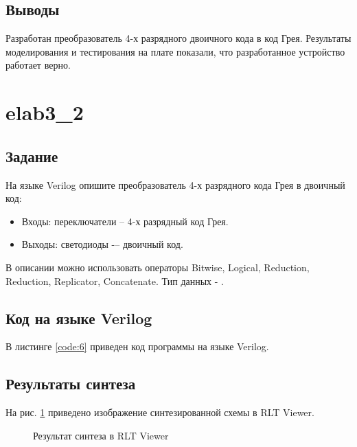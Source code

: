 \subsection{Выводы}

Разработан преобразователь 4-х разрядного двоичного кода в код Грея. Результаты моделирования и тестирования на плате показали, что разработанное устройство работает верно.

\section{elab3\_2}

\subsection{Задание}

На языке Verilog опишите преобразователь 4-х разрядного кода Грея в двоичный код:
\begin{itemize}
	\item Входы: переключатели  -- 4-х разрядный код Грея.
	\item Выходы: светодиоды  -– двоичный код.
\end{itemize}

В описании можно использовать операторы Bitwise, Logical, Reduction, Reduction, Replicator, Concatenate. Тип данных - .

\subsection{Код на языке Verilog}

В листинге \ref{code:6} приведен код программы на языке Verilog.

%

\subsection{Результаты синтеза}

На рис. \ref{fig:elab3_2_rtl} приведено изображение синтезированной схемы в RLT Viewer.

\begin{figure}[H]
\begin{center}
	\caption{Результат синтеза в RLT Viewer}
	\label{fig:elab3_2_rtl}
\end{center}
\end{figure}

